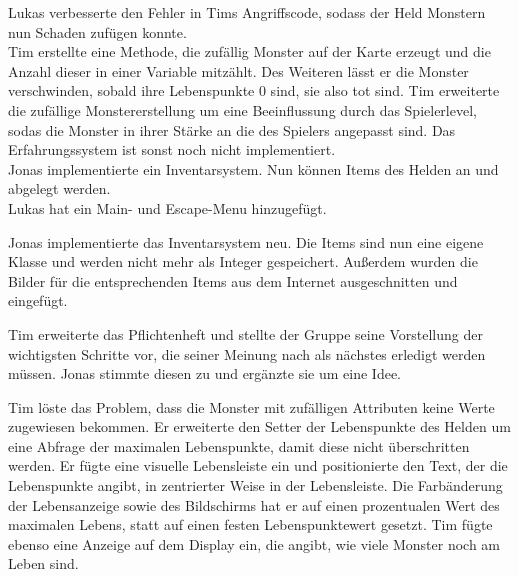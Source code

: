 
Lukas verbesserte den Fehler in Tims \glqq{}Angriffscode\grqq{}, sodass der Held Monstern nun Schaden zufügen konnte. \\
Tim erstellte eine Methode, die zufällig Monster auf der Karte erzeugt und die Anzahl dieser in einer Variable mitzählt. Des Weiteren lässt er die Monster verschwinden, sobald ihre Lebenspunkte 0 sind, sie also tot sind. Tim erweiterte die zufällige Monstererstellung um eine Beeinflussung durch das Spielerlevel, sodas die Monster in ihrer Stärke an die des Spielers angepasst sind. Das Erfahrungssystem ist sonst noch nicht implementiert. \\
Jonas implementierte ein Inventarsystem. Nun können Items des Helden an und abgelegt werden. \\
Lukas hat ein Main- und Escape-Menu hinzugefügt. \\


Jonas implementierte das Inventarsystem neu. Die Items sind nun eine eigene Klasse und werden nicht mehr als Integer gespeichert. Außerdem wurden die Bilder für die entsprechenden Items aus dem Internet ausgeschnitten und eingefügt. \\


Tim erweiterte das Pflichtenheft und stellte der Gruppe seine Vorstellung der wichtigsten Schritte vor, die seiner Meinung nach als nächstes erledigt werden müssen. Jonas stimmte diesen zu und ergänzte sie um eine Idee. \\


Tim löste das Problem, dass die Monster mit zufälligen Attributen keine Werte zugewiesen bekommen. Er erweiterte den Setter der Lebenspunkte des Helden um eine Abfrage der maximalen Lebenspunkte, damit diese nicht überschritten werden. Er fügte eine visuelle Lebensleiste ein und positionierte den Text, der die Lebenspunkte angibt, in zentrierter Weise in der Lebensleiste. Die Farbänderung der Lebensanzeige sowie des Bildschirms hat er auf einen prozentualen Wert des maximalen Lebens, statt auf einen festen Lebenspunktewert gesetzt. Tim fügte ebenso eine Anzeige auf dem Display ein, die angibt, wie viele Monster noch am Leben sind. \\


